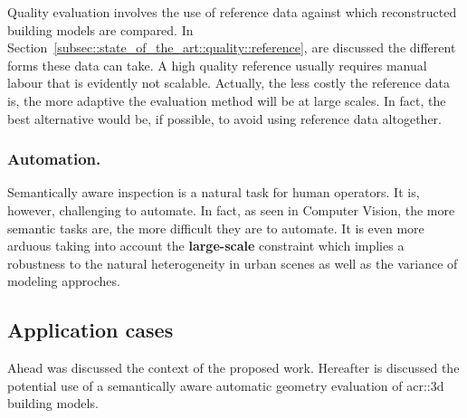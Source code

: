             Quality evaluation involves the use of reference data against which reconstructed building models are compared.
            In Section~\ref{subsec::state_of_the_art::quality::reference}, are discussed the different forms these data can take.
            A high quality reference usually requires manual labour that is evidently not scalable.
            Actually, the less costly the reference data is, the more adaptive the evaluation method will be at large scales.
            In fact, the best alternative would be, if possible, to avoid using reference data altogether.

        \subsubsection{Automation.}
            Semantically aware inspection is a natural task for human operators.
            It is, however, challenging to automate.
            In fact, as seen in Computer Vision, the more semantic tasks are, the more difficult they are to automate.
            It is even more arduous taking into account the \textbf{large-scale} constraint which implies a robustness to the natural heterogeneity in urban scenes as well as the variance of modeling approches.

    \subsection{Application cases}
        \label{subsec::introduction::contributions::use}
        Ahead was discussed the context of the proposed work.
        Hereafter is discussed the potential use of a semantically aware automatic geometry evaluation of \gls{acr::3d} building models.
